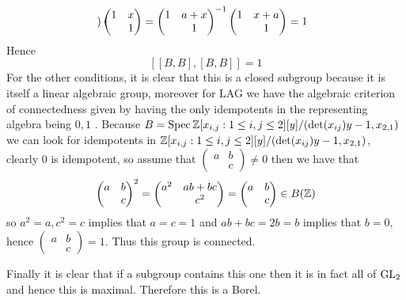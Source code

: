 \begin{example}
\[\begin{pmatrix}
        \end{pmatrix}\begin{pmatrix}
            1 & x \\ & 1
        \end{pmatrix} = \begin{pmatrix}
            1 & a + x \\ & 1
        \end{pmatrix}^{-1} \begin{pmatrix}
            1 & x+a \\ & 1
        \end{pmatrix} = 1\]
        Hence 
    \[[[B, B], [B, B]] = 1\]
    For the other conditions, it is clear that this is a closed subgroup because it is itself a linear algebraic group, moreover for LAG we have the algebraic criterion of connectedness given by having the only idempotents in the representing algebra being \(0, 1\) \cite[1.5]{getzIntroductionAutomorphicRepresentations2024}. Because \(B = \Spec \Z[x_{i,j}: 1\leq i,j\leq 2][y] / (\det(x_{ij})y - 1, x_{2,1})\) we can look for idempotents in \(\Z[x_{i,j}: 1\leq i,j\leq 2][y] / (\det(x_{ij})y - 1, x_{2,1})\), clearly \(0\) is idempotent, so assume that \(\begin{pmatrix}
        a & b \\ & c
    \end{pmatrix}\neq 0\) then we have that  
    \[\begin{pmatrix}
        a & b \\ & c
    \end{pmatrix}^2 = \begin{pmatrix}
        a^2 & ab + bc \\ & c^2
    \end{pmatrix} = \begin{pmatrix}
        a & b \\ & c
    \end{pmatrix}\in B(\Z)\]
    so \(a^2 = a, c^2 = c\) implies that \(a = c = 1\) and \(ab + bc = 2b = b\) implies that \(b=0\), hence \(\begin{pmatrix}
        a & b \\ & c
    \end{pmatrix} = 1\). Thus this group is connected. 
    
    Finally it is clear that if a subgroup contains this one then it is in fact all of \(\operatorname{GL}_2\) and hence this is maximal. Therefore this is a Borel.
    \end{example}
        
